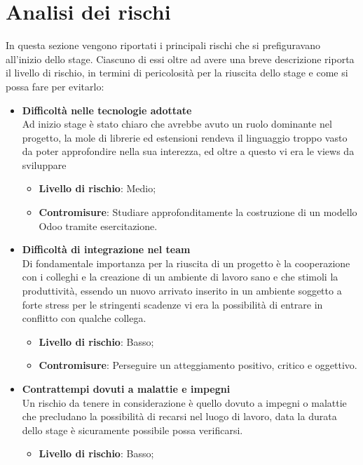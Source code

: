 \section{Analisi dei rischi}
In questa sezione vengono riportati i principali rischi che si prefiguravano all'inizio dello stage. Ciascuno di essi oltre ad avere una breve descrizione riporta il livello di rischio, in termini di pericolosità per la riuscita dello stage e come si possa fare per evitarlo:
\begin{itemize}
	\item \textbf{Difficoltà nelle tecnologie adottate}\\
	      Ad inizio stage è stato chiaro che  avrebbe avuto un ruolo dominante nel progetto, la mole di librerie ed estensioni rendeva il linguaggio troppo vasto da poter approfondire nella sua interezza, ed oltre a questo vi era le views da sviluppare
	      \begin{itemize}
	      	\item \textbf{Livello di rischio}: Medio;
	      	\item \textbf{Contromisure}: Studiare approfonditamente la costruzione di un modello Odoo tramite esercitazione.
	      \end{itemize}
	\item \textbf{Difficoltà di integrazione nel team}\\
	      Di fondamentale importanza per la riuscita di un progetto è la cooperazione con i colleghi e la creazione di un ambiente di lavoro sano e che stimoli la produttività, essendo un nuovo arrivato inserito in un ambiente soggetto a forte stress per le stringenti scadenze vi era la possibilità di entrare in conflitto con qualche collega.
	      \begin{itemize}
	      	\item \textbf{Livello di rischio}: Basso;
	      	\item \textbf{Contromisure}: Perseguire un atteggiamento positivo, critico e oggettivo.
	      \end{itemize}
	\item \textbf{Contrattempi dovuti a malattie e impegni}\\
	      Un rischio da tenere in considerazione è quello dovuto a impegni o malattie che precludano la possibilità di recarsi nel luogo di lavoro, data la durata dello stage è sicuramente possibile possa verificarsi.
	      \begin{itemize}
	      	\item \textbf{Livello di rischio}: Basso;

\end{itemize}
\end{itemize}
